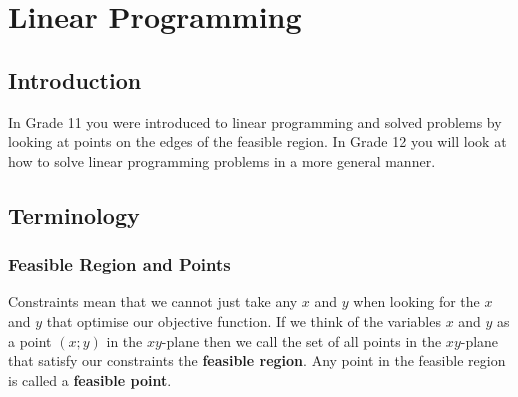 \chapter{Linear Programming}
\label{m:lp12}



\section{Introduction}
In Grade 11 you were introduced to linear programming and solved problems by looking at points on the edges of the feasible region. In Grade 12 you will look at how to solve linear programming problems in a more general manner.

\section{Terminology}
\subsection{Feasible Region and Points}
Constraints mean that we cannot just take any $x$ and $y$ when looking for the $x$ and $y$ that optimise our objective function. If we think of the variables $x$ and $y$ as a point $(x;y)$ in the $xy$-plane then we call the set of all points in the $xy$-plane that satisfy 
our constraints the \textbf{feasible region}. Any point in the feasible region is called a \textbf{feasible point}.

